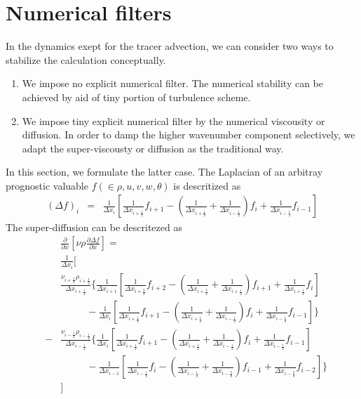 \section{Numerical filters}

In the dynamics exept for the tracer advection,
we can consider two ways to stabilize the calculation conceptually.
\begin{enumerate}
\item We impose no explicit numerical filter.
The numerical stability can be achieved
by aid of tiny portion of turbulence scheme.
\item We impose tiny explicit numerical filter by the numerical viscousity or diffusion.
In order to damp the higher wavenumber component selectively,
we adapt the super-viscousty or diffusion as the traditional way.
\end{enumerate}
In this section, we formulate the latter case.
The Laplacian of an arbitray prognostic valuable $f (\in \rho, u, v, w, \theta)$ 
is descritized as
{\footnotesize
\begin{eqnarray}
(\Delta f)_i &=& 
\frac{1}{\Delta x_i}\left[
\frac{1}{\Delta x_{i+\frac{1}{2}}}f_{i+1}
-\left(\frac{1}{\Delta x_{i+\frac{1}{2}}}+\frac{1}{\Delta x_{i-\frac{1}{2}}}\right)f_i
+\frac{1}{\Delta x_{i-\frac{1}{2}}}f_{i-1}\right]
%
\end{eqnarray}
}
The super-diffusion can be descritezed as
{\footnotesize
\begin{eqnarray}
&&\frac{\partial }{\partial x}\left[\nu \rho \frac{\partial \Delta f}{\partial x}\right]  =\nonumber\\
&&
\frac{1}{\Delta x_{i}}
\Bigg[\nonumber\\
&&\frac{\nu_{i+\frac{1}{2}}\rho_{i+\frac{1}{2}}}{\Delta x_{i+\frac{1}{2}}}
\Bigg\{\frac{1}{\Delta x_{i+1}}\left[
\frac{1}{\Delta x_{i+\frac{3}{2}}}f_{i+2}
-\left(\frac{1}{\Delta x_{i+\frac{3}{2}}}+\frac{1}{\Delta x_{i+\frac{1}{2}}}\right)f_{i+1}
+\frac{1}{\Delta x_{i+\frac{1}{2}}}f_{i}\right]\nonumber\\
&&~~~~~~~~~~~~ -\frac{1}{\Delta x_i}\left[
\frac{1}{\Delta x_{i+\frac{1}{2}}}f_{i+1}
-\left(\frac{1}{\Delta x_{i+\frac{1}{2}}}+\frac{1}{\Delta x_{i-\frac{1}{2}}}\right)f_i
+\frac{1}{\Delta x_{i-\frac{1}{2}}}f_{i-1}\right]\Bigg\}
\nonumber\\
%
&-&
\frac{\nu_{i-\frac{1}{2}}\rho_{i-\frac{1}{2}}}{\Delta x_{i-\frac{1}{2}}}
\Bigg\{\frac{1}{\Delta x_{i}}\left[
\frac{1}{\Delta x_{i+\frac{1}{2}}}f_{i+1}
-\left(\frac{1}{\Delta x_{i+\frac{1}{2}}}+\frac{1}{\Delta x_{i-\frac{1}{2}}}\right)f_{i}
+\frac{1}{\Delta x_{i-\frac{1}{2}}}f_{i-1}\right]\nonumber\\
&&~~~~~~~~~~~~ -\frac{1}{\Delta x_{i-1}}\left[
\frac{1}{\Delta x_{i-\frac{1}{2}}}f_{i}
-\left(\frac{1}{\Delta x_{i-\frac{1}{2}}}+\frac{1}{\Delta x_{i-\frac{3}{2}}}\right)f_{i-1}
+\frac{1}{\Delta x_{i-\frac{3}{2}}}f_{i-2}\right]\Bigg\}\nonumber\\
&&\Bigg]
%
%
\end{eqnarray}
}
